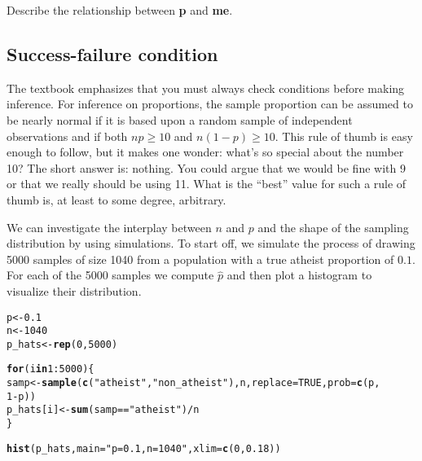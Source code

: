 \documentclass{article}\usepackage[]{graphicx}\usepackage[]{color}
\makeatletter
\newcommand{\hlnum}[1]{\textcolor[rgb]{0.686,0.059,0.569}{#1}}%
\newcommand{\hlstr}[1]{\textcolor[rgb]{0.192,0.494,0.8}{#1}}%
\newcommand{\hlopt}[1]{\textcolor[rgb]{0,0,0}{#1}}%
\newcommand{\hlstd}[1]{\textcolor[rgb]{0.345,0.345,0.345}{#1}}%
\newcommand{\hlkwa}[1]{\textcolor[rgb]{0.161,0.373,0.58}{\textbf{#1}}}%
\newcommand{\hlkwb}[1]{\textcolor[rgb]{0.69,0.353,0.396}{#1}}%
\newcommand{\hlkwc}[1]{\textcolor[rgb]{0.333,0.667,0.333}{#1}}%
\newcommand{\hlkwd}[1]{\textcolor[rgb]{0.737,0.353,0.396}{\textbf{#1}}}%
\newenvironment{kframe}{%
 \def\at@end@of@kframe{}%
 \ifinner\ifhmode%
  \def\at@end@of@kframe{\end{minipage}}%
  \begin{minipage}{\columnwidth}%
 \fi\fi%
 \def\FrameCommand##1{\hskip\@totalleftmargin \hskip-\fboxsep
 \colorbox{shadecolor}{##1}\hskip-\fboxsep
     \hskip-\linewidth \hskip-\@totalleftmargin \hskip\columnwidth}%
 \MakeFramed {\advance\hsize-\width
   \@totalleftmargin\z@ \linewidth\hsize
   \@setminipage}}%
 {\par\unskip\endMakeFramed%
 \at@end@of@kframe}
\newenvironment{knitrout}{}{} %
\makeatother
\begin{document}
\begin{exercise}
Describe the relationship between \hlkwd{p} and \hlkwd{me}.
\end{exercise}

\subsection*{Success-failure condition}
The textbook emphasizes that you must always check conditions before making inference. For inference on proportions, the sample proportion can be assumed to be nearly normal if it is based upon a random sample of independent observations and if both $np \geq 10$ and $n(1 - p) \geq 10$. This rule of thumb is easy enough to follow, but it makes one wonder: what's so special about the number 10? The short answer is: nothing. You could argue that we would be fine with 9 or that we really should be using 11. What is the ``best'' value for such a rule of thumb is, at least to some degree, arbitrary.


We can investigate the interplay between $n$ and $p$ and the shape of the sampling distribution by using simulations. To start off, we simulate the process of drawing 5000 samples of size 1040 from a population with a true atheist proportion of $0.1$. For each of the 5000 samples we compute $\hat{p}$ and then plot a histogram to visualize their distribution.

\begin{knitrout}
\color{fgcolor}\begin{kframe}
\begin{alltt}
\hlstd{p} \hlkwb{<-} \hlnum{0.1}
\hlstd{n} \hlkwb{<-} \hlnum{1040}
\hlstd{p_hats} \hlkwb{<-} \hlkwd{rep}\hlstd{(}\hlnum{0}\hlstd{,} \hlnum{5000}\hlstd{)}

\hlkwa{for} \hlstd{(i} \hlkwa{in} \hlnum{1}\hlopt{:}\hlnum{5000}\hlstd{) \{}
    \hlstd{samp} \hlkwb{<-} \hlkwd{sample}\hlstd{(}\hlkwd{c}\hlstd{(}\hlstr{"atheist"}\hlstd{,} \hlstr{"non_atheist"}\hlstd{), n,} \hlkwc{replace} \hlstd{=} \hlnum{TRUE}\hlstd{,} \hlkwc{prob} \hlstd{=} \hlkwd{c}\hlstd{(p,}
        \hlnum{1} \hlopt{-} \hlstd{p))}
    \hlstd{p_hats[i]} \hlkwb{<-} \hlkwd{sum}\hlstd{(samp} \hlopt{==} \hlstr{"atheist"}\hlstd{)}\hlopt{/}\hlstd{n}
\hlstd{\}}

\hlkwd{hist}\hlstd{(p_hats,} \hlkwc{main} \hlstd{=} \hlstr{"p = 0.1, n = 1040"}\hlstd{,} \hlkwc{xlim} \hlstd{=} \hlkwd{c}\hlstd{(}\hlnum{0}\hlstd{,} \hlnum{0.18}\hlstd{))}
\end{alltt}
\end{kframe}
\end{knitrout}
\end{document}
